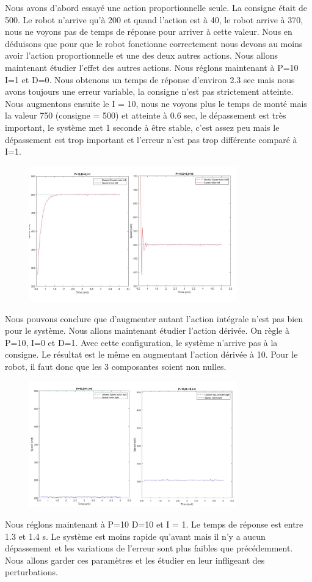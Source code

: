 \documentclass[a4paper]{article}
\begin{document}
		Nous avons d’abord essayé une action proportionnelle seule. La consigne était de 500. Le robot n’arrive qu'à 200 et quand l’action est à 40, le robot arrive à 370, nous ne voyons pas de temps de réponse pour arriver à cette valeur. Nous en déduisons que pour que le robot fonctionne correctement nous devons au moins avoir l’action proportionnelle et une des deux autres actions.
		Nous allons maintenant étudier l’effet des autres actions.
		Nous réglons maintenant à P=10 I=1 et D=0. Nous obtenons un temps de réponse d’environ 2.3 sec mais nous avons toujours une erreur variable, la consigne n’est pas strictement atteinte.
		Nous augmentons ensuite le I = 10, nous ne voyons plus le temps de monté mais la valeur 750 (consigne = 500) et atteinte à 0.6 sec, le dépassement est très important, le système met 1 seconde à être stable, c’est assez peu mais le dépassement est trop important et l’erreur n’est pas trop différente comparé à I=1.
		\begin{figure}[h]
			\centering
			\includegraphics[width = 9cm]{imgs/fig6.png}
			\caption{}
		\end{figure}
		Nous pouvons conclure que d’augmenter autant l’action intégrale n’est pas bien pour le système.
		Nous allons maintenant étudier l’action dérivée. On règle à P=10, I=0 et D=1. Avec cette configuration, le système n’arrive pas à la consigne.  Le résultat est le même en augmentant l’action dérivée à 10. Pour le robot, il faut donc que les 3 composantes soient non nulles.
		
		\begin{figure}[h]
			\centering
			\includegraphics[width = 9cm]{imgs/fig7.png}
			\caption{}
		\end{figure}
		Nous réglons maintenant à P=10 D=10 et I = 1. Le temps de réponse est entre 1.3 et 1.4 s. Le système est moins rapide qu’avant mais il n’y a aucun dépassement et les variations de l’erreur sont plus faibles que précédemment. Nous allons garder ces paramètres et les étudier en leur infligeant des perturbations.\\
\end{document}
